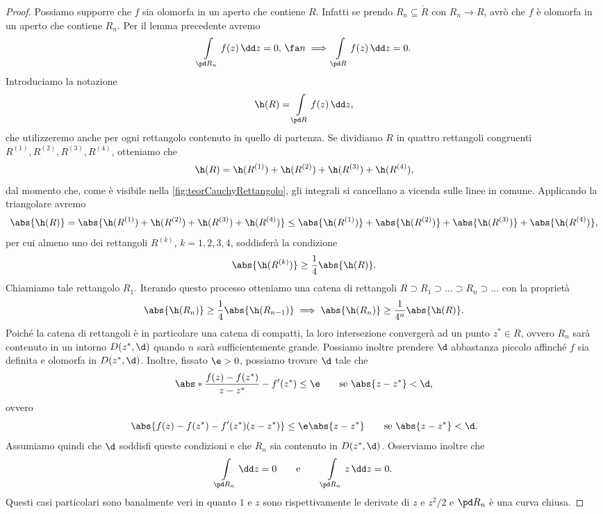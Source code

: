 \begin{proof}
	Possiamo supporre che \(f\) sia olomorfa in un aperto che contiene \(R\). Infatti se prendo \(R_n \subseteq \mathring{R}\) con \(R_n \to R\), avrò che \(f\) è olomorfa in un aperto che contiene \(R_n\).
	Per il lemma precedente avremo
	\[
		\int\limits_{\pd R_n}f(z)\,\dd z = 0,\,\fa n \implies \int\limits_{\pd R}f(z)\,\dd z =0.
	\]
	Introduciamo la notazione
	\[
		\h(R) = \int\limits_{\pd R}f(z)\,\dd z,
	\]
	che utilizzeremo anche per ogni rettangolo contenuto in quello di partenza.
	Se dividiamo \(R\) in quattro rettangoli congruenti \(R^{(1)},R^{(2)},R^{(3)},R^{(4)}\), otteniamo che
	\[
		\h(R) = \h(R^{(1)})+\h(R^{(2)})+\h(R^{(3)})+\h(R^{(4)}),
	\]
	dal momento che, come è visibile nella \autoref{fig:teorCauchyRettangolo}, gli integrali si cancellano a vicenda sulle linee in comune.
	Applicando la triangolare avremo
	\[
		\abs{\h(R)} = \abs{\h(R^{(1)})+\h(R^{(2)})+\h(R^{(3)})+\h(R^{(4)})} \le \abs{\h(R^{(1)})}+\abs{\h(R^{(2)})}+\abs{\h(R^{(3)})}+\abs{\h(R^{(4)})},
	\]
	per cui almeno uno dei rettangoli \(R^{(k)}\), \(k=1,2,3,4\), soddisferà la condizione
	\[
		\abs{\h(R^{(k)})} \ge \frac{1}{4}\abs{\h(R)}.
	\]
	Chiamiamo tale rettangolo \(R_1\).
	Iterando questo processo otteniamo una catena di rettangoli \(R\supset R_1 \supset \ldots \supset R_n \supset ...\) con la proprietà
	\[
		\abs{\h(R_n)} \ge \frac{1}{4}\abs{\h(R_{n-1})} \implies \abs{\h(R_n)} \ge \frac{1}{4^n}\abs{\h(R)}.
	\]
	Poiché la catena di rettangoli è in particolare una catena di compatti, la loro intersezione convergerà ad un punto \(z^*\in R\), ovvero \(R_n\) sarà contenuto in un intorno \(D(z^*,\d)\) quando \(n\) sarà sufficientemente grande.
	Possiamo inoltre prendere \(\d\) abbastanza piccolo affinché \(f\) sia definita e olomorfa in \(D(z^*,\d)\).
	Inoltre, fissato \(\e>0\), possiamo trovare \(\d\) tale che
	\[
		\abs*{\frac{f(z)-f(z^*)}{z-z^*}-f'(z^*)} \le \e \qquad\text{se }\abs{z-z^*}<\d,
	\]
	ovvero
	\begin{equation}\label{eq:teorCauchyRettangoli}
		\abs{f(z)-f(z^*)-f'(z^*)(z-z^*)} \le \e\abs{z-z^*} \qquad\text{se }\abs{z-z^*}<\d.
	\end{equation}
	Assumiamo quindi che \(\d\) soddisfi queste condizioni e che \(R_n\) sia contenuto in \(D(z^*,\d)\).
	Osserviamo inoltre che
	\[
		\int\limits_{\pd R_n} \dd z = 0 \qquad\text{e}\qquad \int\limits_{\pd R_n} z\,\dd z = 0.
	\]
	Questi casi particolari sono banalmente veri in quanto \(1\) e \(z\) sono rispettivamente le derivate di \(z\) e \(z^2/2\) e \(\pd R_n\) è una curva chiusa.


\end{proof}
